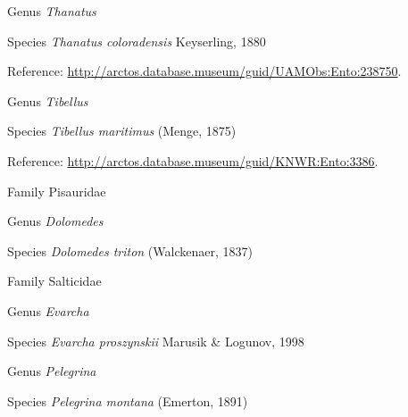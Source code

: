\documentclass[9pt, article]{memoir}
\begin{document}
\begin{multicols}{2}
\vspace{6pt}\noindent\hspace{30pt}Genus \textit{Thanatus}


\vspace{6pt}\noindent\hspace{36pt}Species \textit{Thanatus coloradensis} Keyserling, 1880


\vspace{6pt}Reference: 
\url{http://arctos.database.museum/guid/UAMObs:Ento:238750}.

\vspace{6pt}\noindent\hspace{30pt}Genus \textit{Tibellus}


\vspace{6pt}\noindent\hspace{36pt}Species \textit{Tibellus maritimus} (Menge, 1875)


\vspace{6pt}Reference: 
\url{http://arctos.database.museum/guid/KNWR:Ento:3386}.

\vspace{6pt}\noindent\hspace{24pt}Family Pisauridae


\vspace{6pt}\noindent\hspace{30pt}Genus \textit{Dolomedes}


\vspace{6pt}\noindent\hspace{36pt}Species \textit{Dolomedes triton} (Walckenaer, 1837)


\vspace{6pt}\noindent\hspace{24pt}Family Salticidae


\vspace{6pt}\noindent\hspace{30pt}Genus \textit{Evarcha}


\vspace{6pt}\noindent\hspace{36pt}Species \textit{Evarcha proszynskii} Marusik \& Logunov, 1998


\vspace{6pt}\noindent\hspace{30pt}Genus \textit{Pelegrina}


\vspace{6pt}\noindent\hspace{36pt}Species \textit{Pelegrina montana} (Emerton, 1891)



\end{multicols}
\end{document}
